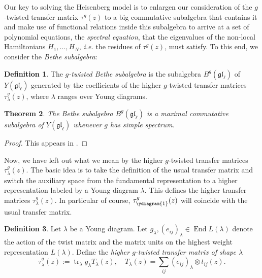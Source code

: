 \documentclass[11pt]{report}
\newtheorem{theorem}{Theorem}[section]
\theoremstyle{definition}
\newtheorem{definition}[theorem]{Definition}
\theoremstyle{remark}
\theoremstyle{remark}
\begin{document}
Our key to solving the Heisenberg model is to enlargen our consideration of the $g$-twisted transfer matrix $\tau^g(z)$ to a big commutative subalgebra that contains it and make use of functional relations inside this subalgebra to arrive at a set of polynomial equations, the \emph{spectral equation}, that the eigenvalues of the non-local Hamiltonians $H_1,...,H_N$, \emph{i.e.} the residues of $\tau^g(z)$, must satisfy. To this end, we consider the \emph{Bethe subalgebra}:

\begin{definition}
The \emph{$g$-twisted Bethe subalgebra} is the subalgebra $B^g(\mathfrak{gl}_\ell)$ of $Y(\mathfrak{gl}_\ell)$ generated by the coefficients of the higher $g$-twisted transfer matrices $\tau_\lambda^g(z)$, where $\lambda$ ranges over Young diagrams.
\end{definition}

\begin{theorem}
The Bethe subalgebra $B^g(\mathfrak{gl}_\ell)$ is a maximal commutative subalgebra of $Y(\mathfrak{gl}_\ell)$ whenever $g$ has simple spectrum.
\end{theorem}

\begin{proof}
This appears in \cite{article:nazarov:1996}.
\end{proof}

Now, we have left out what we mean by the higher $g$-twisted transfer matrices $\tau_\lambda^g(z)$. The basic idea is to take the definition of the usual transfer matrix and switch the auxiliary space from the fundamental representation to a higher representation labeled by a Young diagram $\lambda$. This defines the higher transfer matrices $\tau_\lambda^g(z)$. In particular of course, $\tau_{\ydiagram{1}}^g(z)$ will coincide with the usual transfer matrix.

\begin{definition}
Let $\lambda$ be a Young diagram. Let $g_\lambda,(e_{ij})_\lambda \in \operatorname{End} L(\lambda)$ denote the action of the twist matrix and the matrix units on the highest weight representation $L(\lambda)$. Define the \emph{higher $g$-twisted transfer matrix of shape $\lambda$}
\begin{equation*}
\tau_\lambda^g(z) := \operatorname{tr}_\lambda g_\lambda T_\lambda(z), \quad T_\lambda(z) = \sum_{ij} (e_{ij})_\lambda \otimes t_{ij}(z).
\end{equation*}
\end{definition}
\end{document}
